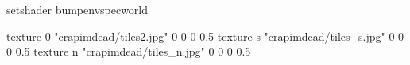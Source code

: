 setshader bumpenvspecworld

texture 0 "crapimdead/tiles2.jpg" 0 0 0 0.5
texture s "crapimdead/tiles_s.jpg" 0 0 0 0.5
texture n "crapimdead/tiles_n.jpg" 0 0 0 0.5
